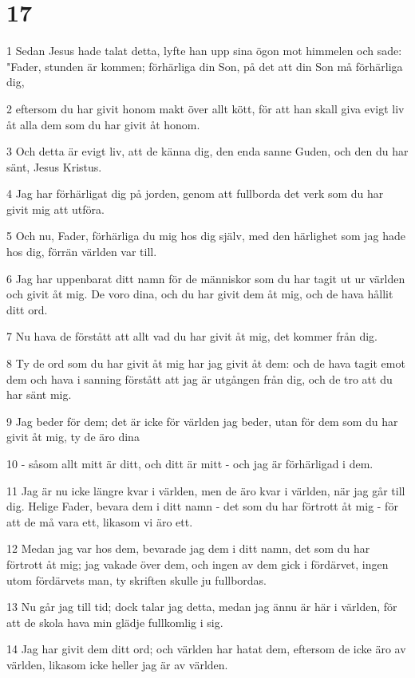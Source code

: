 \chapter{17}

\par 1 Sedan Jesus hade talat detta, lyfte han upp sina ögon mot himmelen och sade: "Fader, stunden är kommen; förhärliga din Son, på det att din Son må förhärliga dig,
\par 2 eftersom du har givit honom makt över allt kött, för att han skall giva evigt liv åt alla dem som du har givit åt honom.
\par 3 Och detta är evigt liv, att de känna dig, den enda sanne Guden, och den du har sänt, Jesus Kristus.
\par 4 Jag har förhärligat dig på jorden, genom att fullborda det verk som du har givit mig att utföra.
\par 5 Och nu, Fader, förhärliga du mig hos dig själv, med den härlighet som jag hade hos dig, förrän världen var till.
\par 6 Jag har uppenbarat ditt namn för de människor som du har tagit ut ur världen och givit åt mig. De voro dina, och du har givit dem åt mig, och de hava hållit ditt ord.
\par 7 Nu hava de förstått att allt vad du har givit åt mig, det kommer från dig.
\par 8 Ty de ord som du har givit åt mig har jag givit åt dem: och de hava tagit emot dem och hava i sanning förstått att jag är utgången från dig, och de tro att du har sänt mig.
\par 9 Jag beder för dem; det är icke för världen jag beder, utan för dem som du har givit åt mig, ty de äro dina
\par 10 - såsom allt mitt är ditt, och ditt är mitt - och jag är förhärligad i dem.
\par 11 Jag är nu icke längre kvar i världen, men de äro kvar i världen, när jag går till dig. Helige Fader, bevara dem i ditt namn - det som du har förtrott åt mig - för att de må vara ett, likasom vi äro ett.
\par 12 Medan jag var hos dem, bevarade jag dem i ditt namn, det som du har förtrott åt mig; jag vakade över dem, och ingen av dem gick i fördärvet, ingen utom fördärvets man, ty skriften skulle ju fullbordas.
\par 13 Nu går jag till tid; dock talar jag detta, medan jag ännu är här i världen, för att de skola hava min glädje fullkomlig i sig.
\par 14 Jag har givit dem ditt ord; och världen har hatat dem, eftersom de icke äro av världen, likasom icke heller jag är av världen.
